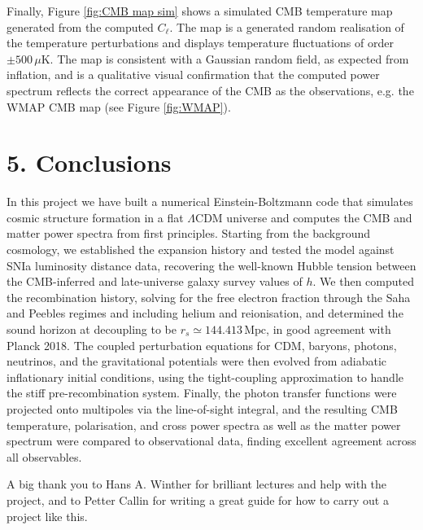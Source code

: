 \documentclass[twocolumn]{aa}
\begin{document}
Finally, Figure \ref{fig:CMB map sim} shows a simulated CMB temperature map generated from the computed $C_\ell$. The map is a generated random realisation of the temperature perturbations and displays temperature fluctuations of order $\pm 500\,\mu\text{K}$. The map is consistent with a Gaussian random field, as expected from inflation, and is a qualitative visual confirmation that the computed power spectrum reflects the correct appearance of the CMB as the observations, e.g. the WMAP CMB map (see Figure \ref{fig:WMAP}).



\section*{5. Conclusions}

In this project we have built a numerical Einstein-Boltzmann code that simulates cosmic structure formation in a flat $\Lambda$CDM universe and computes the CMB and matter power spectra from first principles. Starting from the background cosmology, we established the expansion history and tested the model against SNIa luminosity distance data, recovering the well-known Hubble tension between the CMB-inferred and late-universe galaxy survey values of $h$. We then computed the recombination history, solving for the free electron fraction through the Saha and Peebles regimes and including helium and reionisation, and determined the sound horizon at decoupling to be $r_s \simeq 144.413\,\text{Mpc}$, in good agreement with Planck 2018. The coupled perturbation equations for CDM, baryons, photons, neutrinos, and the gravitational potentials were then evolved from adiabatic inflationary initial conditions, using the tight-coupling approximation to handle the stiff pre-recombination system. Finally, the photon transfer functions were projected onto multipoles via the line-of-sight integral, and the resulting CMB temperature, polarisation, and cross power spectra as well as the matter power spectrum were compared to observational data, finding excellent agreement across all observables.


\begin{acknowledgements}
      A big thank you to Hans A. Winther for brilliant lectures and help with the project, and to Petter Callin for writing a great guide for how to carry out a project like this.
\end{acknowledgements}



\end{document}
